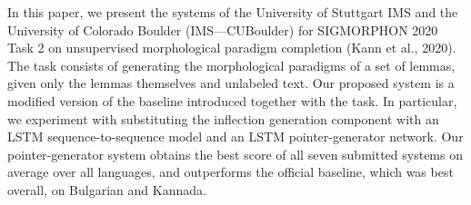 In this paper, we present the systems of the University of Stuttgart IMS and the University of Colorado Boulder (IMS---CUBoulder) for SIGMORPHON 2020 Task 2 on unsupervised morphological paradigm completion (Kann et al., 2020). The task consists of generating the morphological paradigms of a set of lemmas, given only the lemmas themselves and unlabeled text. Our proposed system is a modified version of the baseline introduced together with the task. In particular, we experiment with substituting the inflection generation component with an LSTM sequence-to-sequence model and an LSTM pointer-generator network. Our pointer-generator system obtains the best score of all seven submitted systems on average over all languages, and outperforms the official baseline, which was best overall, on Bulgarian and Kannada.
